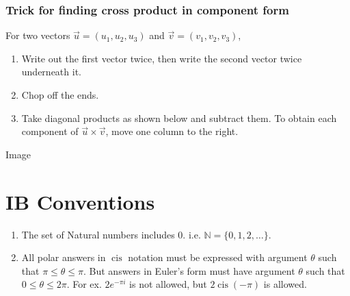 \documentclass{article}
\DeclareMathOperator\cis{cis}
\theoremstyle{definition}
\numberwithin{equation}{section}
\begin{document}
\subsubsection*{Trick for finding cross product in component form}
For two vectors $\vec u = (u_1,u_2,u_3)$ and $\vec v = (v_1,v_2,v_3)$,
\begin{enumerate}
	\item Write out the first vector twice, then write the second vector twice underneath it.
	\item Chop off the ends.
	\item Take diagonal products as shown below and subtract them. To obtain each component of $\vec u \times \vec v$, move one column to the right.
\end{enumerate}

Image

\section{IB Conventions}
\begin{enumerate}
	\item The set of Natural numbers includes 0. i.e. $\mathbb{N} = \{0,1,2,\dots\}$.
	\item All polar answers in $\cis$ notation must be expressed with argument $\theta$ such that $\pi\le\theta\le\pi$. But answers in Euler's form must have argument $\theta$ such that $0 \le \theta \le 2 \pi$. For ex. $2e^{-\pi i}$ is not allowed, but $2\cis(-\pi)$ is allowed.
\end{enumerate}
\end{document}
